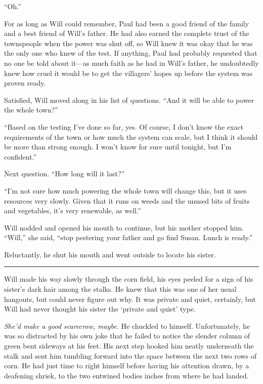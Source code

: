 \documentclass[12pt,letterpaper,oneside,english]{book}
\begin{document}
``Oh.''

For as long as Will could remember, Paul had been a good friend of the
family and a best friend of Will's father. He had also earned the
complete trust of the townspeople when the power was shut off, so Will
knew it was okay that he was the only one who knew of the test. If
anything, Paul had probably requested that no one be told about it---as
much faith as he had in Will's father, he undoubtedly knew how cruel it
would be to get the villagers' hopes up before the system was proven
ready.

Satisfied, Will moved along in his list of questions. ``And it will be
able to power the whole town?''

``Based on the testing I've done so far, yes. Of course, I don't know
the exact requirements of the town or how much the system can scale, but
I think it should be more than strong enough. I won't know for sure
until tonight, but I'm confident.''

Next question. ``How long will it last?''

``I'm not sure how much powering the whole town will change this, but it
uses resources very slowly. Given that it runs on weeds and the unused
bits of fruits and vegetables, it's very renewable, as well.''

Will nodded and opened his mouth to continue, but his mother stopped
him. ``Will,'' she said, ``stop pestering your father and go find
Susan. Lunch is ready.''

Reluctantly, he shut his mouth and went outside to locate his sister.

\medskip
{\centering\rule{\linewidth}{1pt}}
\smallskip

Will made his way slowly through the corn field, his eyes peeled for a
sign of his sister's dark hair among the stalks. He knew that this was
one of her usual hangouts, but could never figure out why. It was
private and quiet, certainly, but Will had never thought his sister the
`private and quiet' type.

\textit{She'd make a good scarecrow, maybe.} He chuckled to himself.
Unfortunately, he was so distracted by his own joke that he failed to
notice the slender column of green bent sideways at his feet. His next
step hooked him neatly underneath the stalk and sent him tumbling
forward into the space between the next two rows of corn. He had just
time to right himself before having his attention drawn, by a deafening
shriek, to the two entwined bodies inches from where he had landed.
\end{document}
